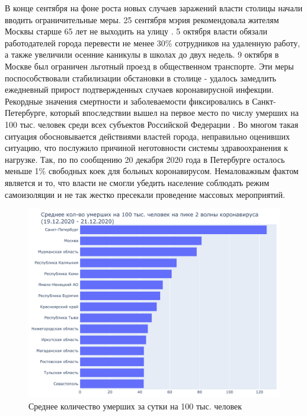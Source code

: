 \documentclass[a4paper, 12pt]{extarticle}
\begin{document}
В конце сентября на фоне роста новых случаев заражений власти столицы начали вводить ограничительные меры. 25 сентября мэрия рекомендовала жителям Москвы старше 65 лет не выходить на улицу . 5 октября власти обязали работодателей города перевести не менее 30\% сотрудников на удаленную работу, а также увеличили осенние каникулы в школах до двух недель. 9 октября в Москве был ограничен льготный проезд в общественном транспорте. Эти меры поспособствовали стабилизации обстановки в столице - удалось замедлить ежедневный прирост подтвержденных случаев коронавирусной инфекции.
\\

Рекордные значения смертности и заболеваемости фиксировались в Санкт-Петербурге, который впоследствии вышел на первое место по числу умерших на 100 тыс. человек среди всех субъектов Российской Федерации . Во многом такая ситуация обосновывается действиями властей города, неправильно оценивших ситуацию, что послужило причиной неготовности системы здравоохранения к нагрузке. Так, по по сообщению 20 декабря 2020 года в Петербурге осталось меньше 1\% свободных коек для больных коронавирусом. Немаловажным фактом является и то, что власти не смогли убедить население соблюдать режим самоизоляции и не так жестко пресекали проведение массовых мероприятий.
\\

\begin{figure}[h]
    \centering
    \includegraphics[scale=0.6]{../plots/6total_deaths_per_100k_bar_plot_2wave.pdf}
    \caption{Среднее количество умерших за сутки на 100 тыс. человек}
    \label{fig:average_deaths_per_100k_2wave}
\end{figure}
\end{document}
